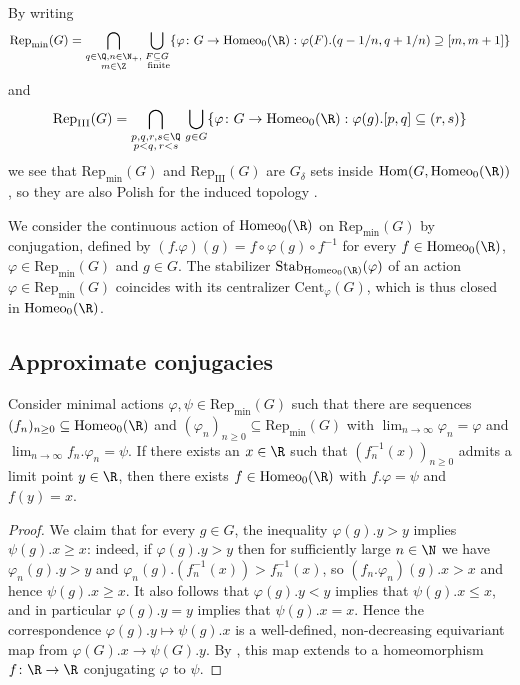 \documentclass[reqno]{amsart}
\begin{document}
By writing
\[
	\mathrm{Rep}_\mathrm{min}(G) = \bigcap_{\substack{q \in \Q, n \in \N_+, \\ m \in \Z}} \bigcup_{\substack{F \subseteq G\\ \text{ finite}} } \{\varphi \colon G \to \mathrm{Homeo}_0(\R) : \varphi(F).(q-1/n, q + 1/n) \supseteq [m,m+1]\}
\]
and
\[
	\mathrm{Rep}_\mathrm{III}(G) = \bigcap_{\substack{p,q,r,s \in \Q \\ p<q,\, r< s}} \,  \bigcup_{g \in G} \{\varphi \colon G \to \mathrm{Homeo}_0(\R) : \varphi(g).[p,q] \subseteq (r,s)\}
\]
we see that $\mathrm{Rep}_\mathrm{min}(G)$ and $\mathrm{Rep}_\mathrm{III}(G)$ are $G_\delta$ sets inside $\mathrm{Hom}(G, \mathrm{Homeo}_0(\R))$, so they are also Polish for the induced topology \cite[(3.11)]{Kechris1995}.

We consider the continuous action of $\mathrm{Homeo}_0(\R)$ on $\mathrm{Rep}_\mathrm{min}(G)$ by conjugation, defined by $(f.\varphi)(g) = f \circ \varphi(g) \circ f^{-1}$ for every $f \in \mathrm{Homeo}_0(\R)$, $\varphi \in \mathrm{Rep}_\mathrm{min}(G)$ and $g \in G$. The stabilizer $\mathrm{Stab}_{\mathrm{Homeo}_0(\R)}(\varphi)$ of an action $\varphi \in \mathrm{Rep}_\mathrm{min}(G)$ coincides with its centralizer $\mathrm{Cent}_\varphi(G)$, which is thus closed in $\mathrm{Homeo}_0(\R)$.%

\subsection{Approximate conjugacies} \label{subsection:approxConj}

\begin{lema} \label{lema:preorden}
Consider minimal actions $\varphi,\psi \in \mathrm{Rep}_\mathrm{min}(G)$ such that there are sequences $(f_n)_{n \geq 0} \subseteq \mathrm{Homeo}_0(\R)$ and $(\varphi_n)_{n\geq 0} \subseteq \mathrm{Rep}_\mathrm{min}(G)$ with $\lim_{n \to \infty} \varphi_n = \varphi$ and $\lim_{n \to \infty} f_n. \varphi_n = \psi$. If there exists an $x \in \R$ such that $(f_n^{-1}(x))_{n \geq 0}$ admits a limit point $y \in \R$, then there exists $f \in \mathrm{Homeo}_0(\R)$ with $f.\varphi = \psi$ and $f(y) = x$.
\end{lema}
\begin{proof}
We claim that for every $g \in G$, the inequality $\varphi(g).y > y$ implies $\psi(g).x \geq x$: indeed, if $\varphi(g).y > y$ then for sufficiently large $n \in \N$ we have $\varphi_n(g).y > y$ and $\varphi_n(g).\left( f_n^{-1}(x) \right) > f_n^{-1}(x)$, so $(f_n. \varphi_n)(g).x > x$ and hence $\psi(g).x \geq x$.  It also follows that $\varphi(g).y < y$ implies that $\psi(g).x \leq x$, and in particular $\varphi(g).y=y$ implies that $\psi(g).x = x$. Hence the correspondence $\varphi(g).y\mapsto \psi(g).x$ is a well-defined, non-decreasing equivariant map from $\varphi(G).x\to  \psi(G).y$. By \cite[Lemma 2.3]{BrumMatteBonRivasTriestino2025}, this map extends to a homeomorphism $f\colon \R\to \R$ conjugating $\varphi$ to $\psi$. \qedhere
\end{proof}
\end{document}
